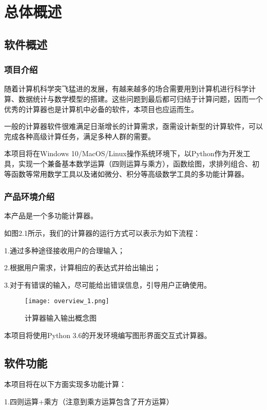 \chapter{总体概述}

\section{软件概述}
\subsection{项目介绍}
随着计算机科学突飞猛进的发展，有越来越多的场合需要用到计算机进行科学计算、数据统计与数学模型的搭建。这些问题到最后都可归结于计算问题，因而一个优秀的计算器也是计算机中必备的软件，本项目也应运而生。

一般的计算器软件很难满足日渐增长的计算需求，亟需设计新型的计算软件，可以完成各种高级计算任务，满足多种人群的需要。

本项目将在Windows 10/MacOS/Linux操作系统环境下，以Python作为开发工具，实现一个兼备基本数学运算（四则运算与乘方），函数绘图，求排列组合、初等函数等常用数学工具以及诸如微分、积分等高级数学工具的多功能计算器。\\


\subsection{产品环境介绍}

本产品是一个多功能计算器。


如图2.1所示，我们的计算器的运行方式可以表示为如下流程：

1.通过多种途径接收用户的合理输入；

2.根据用户需求，计算相应的表达式并给出输出；

3.对于有错误的输入，尽可能给出错误信息，引导用户正确使用。

\begin{figure}[ht]
\centering
\texttt{[image: overview\_1.png]}
\caption{计算器输入输出概念图} \label{fig:overall_conception}
\end{figure}

本项目将使用Python 3.6的开发环境编写图形界面交互式计算器。


\section{软件功能}

本项目将在以下方面实现多功能计算：

1.四则运算+乘方（注意到乘方运算包含了开方运算）

